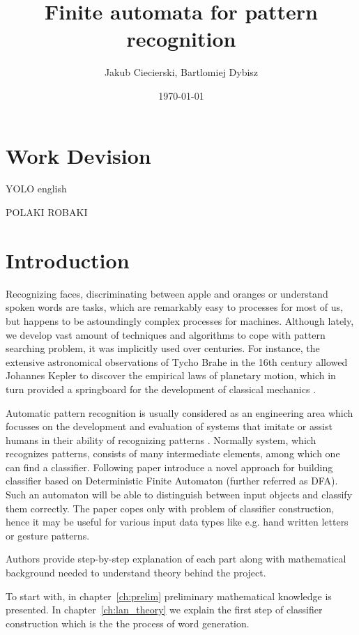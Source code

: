 \documentclass{mini}
\title{Finite automata for pattern recognition}
\author{Jakub Ciecierski, Bartlomiej Dybisz}
\date{\today}
\begin{document}
\maketitle
\tableofcontents

\chapter*{Work Devision}


\abstract
YOLO english

\abstract
POLAKI ROBAKI

\chapter*{Introduction}
Recognizing faces, discriminating between apple and oranges or understand spoken words are tasks, which are remarkably easy to processes for most of us, but happens to be astoundingly complex processes for machines. Although lately, we develop vast amount of techniques and algorithms to cope with pattern searching problem, it was implicitly used over centuries. For instance, the extensive astronomical observations of Tycho Brahe in the 16th century allowed Johannes Kepler to discover the empirical laws of
planetary motion, which in turn provided a springboard for the development of classical mechanics \cite{bishop_book}.

Automatic pattern recognition is usually considered as an engineering area which focusses on the development and evaluation of systems that imitate or assist humans in their ability of recognizing patterns \cite{duch_uuu}. Normally system, which recognizes patterns, consists of many intermediate elements, among which one can find a classifier. Following paper introduce a novel approach for building classifier based on  Deterministic Finite Automaton (further referred as DFA). Such an automaton will be able to distinguish between input objects and classify them correctly. The paper copes only with problem of classifier construction, hence it may be useful for various input data types like e.g. hand written letters or gesture patterns. 

Authors provide step-by-step explanation of each part along with mathematical background needed to understand theory behind the project.

To start with, in chapter~\ref{ch:prelim} preliminary mathematical knowledge is presented. In chapter~\ref{ch:lan_theory} we explain the first step of classifier construction which is the the process of word generation.
\end{document}
